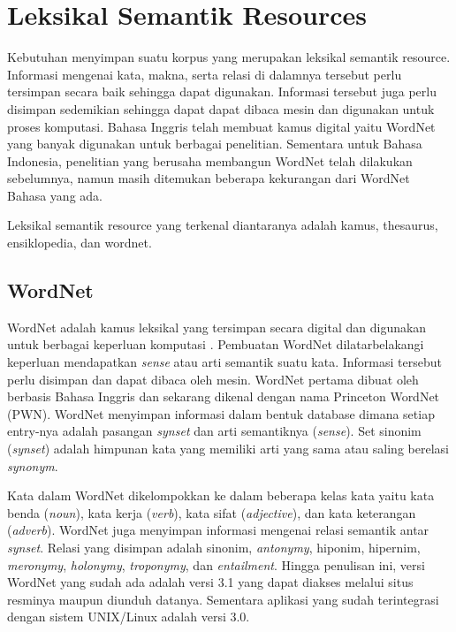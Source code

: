 \section{Leksikal Semantik Resources}
Kebutuhan menyimpan suatu korpus yang merupakan leksikal semantik resource. Informasi mengenai kata, makna, serta relasi di dalamnya tersebut perlu tersimpan secara baik sehingga dapat digunakan. Informasi tersebut juga perlu disimpan sedemikian sehingga dapat dapat dibaca mesin dan digunakan untuk proses komputasi. Bahasa Inggris telah membuat kamus digital yaitu WordNet yang banyak digunakan untuk berbagai penelitian. Sementara untuk Bahasa Indonesia, penelitian yang berusaha membangun WordNet telah dilakukan sebelumnya, namun masih ditemukan beberapa kekurangan dari WordNet Bahasa yang ada. 

Leksikal semantik resource yang terkenal diantaranya adalah kamus, thesaurus, ensiklopedia, dan wordnet. 

\subsection{WordNet}
WordNet adalah kamus leksikal yang tersimpan secara digital dan digunakan untuk berbagai keperluan komputasi \citep{miller1995wordnet}. Pembuatan WordNet dilatarbelakangi keperluan mendapatkan \textit{sense} atau arti semantik suatu kata. Informasi tersebut perlu disimpan dan dapat dibaca oleh mesin. WordNet pertama dibuat oleh \cite{miller1995wordnet} berbasis Bahasa Inggris dan sekarang dikenal dengan nama Princeton WordNet (PWN). WordNet menyimpan informasi dalam bentuk database dimana setiap entry-nya adalah pasangan \textit{synset} dan arti semantiknya (\textit{sense}). Set sinonim (\textit{synset}) adalah himpunan kata yang memiliki arti yang sama atau saling berelasi \textit{synonym}. 

Kata dalam WordNet dikelompokkan ke dalam beberapa kelas kata yaitu kata benda (\textit{noun}), kata kerja (\textit{verb}), kata sifat (\textit{adjective}), dan kata keterangan (\textit{adverb}). WordNet juga menyimpan informasi mengenai relasi semantik antar \textit{synset}. Relasi yang disimpan adalah sinonim, \textit{antonymy}, hiponim, hipernim, \textit{meronymy}, \textit{holonymy}, \textit{troponymy}, dan \textit{entailment}. Hingga penulisan ini, versi WordNet yang sudah ada adalah versi 3.1 yang dapat diakses melalui situs resminya maupun diunduh datanya. Sementara aplikasi yang sudah terintegrasi dengan sistem UNIX/Linux adalah versi 3.0. 

